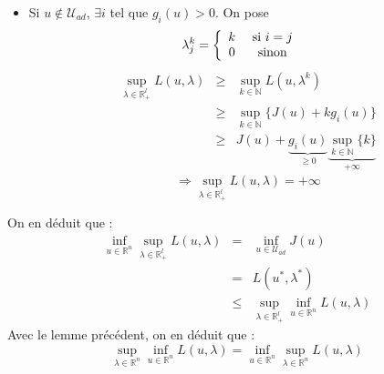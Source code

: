 \begin{dem}
\begin{itemize}
	\item Si $u\not\in \mathcal{U}_{ad}$, $\exists i$ tel que $g_i(u)>0$. On pose 
	\[\lambda_j^k=\left\{ \begin{array}{c c c} k &\text{ si } i=j \\ 0 &\text{ sinon}& \end{array} \right.\]
	\begin{eqnarray*}
		\sup_{\lambda\in\mathbb{R}^l_+} L(u,\lambda) &\geq& \sup_{k\in \mathbb{N}} L(u,\lambda^k) \\
							&\geq& \sup_{k\in\mathbb{N}} \{J(u)+kg_i(u)\} \\
							&\geq& J(u)+\underbrace{g_i(u)}_{\geq 0} \underbrace{\sup_{k\in\mathbb{N}} \{k\}}_{+\infty}
	\end{eqnarray*}
	\[\Rightarrow \sup_{\lambda\in\mathbb{R}^l_+} L(u,\lambda)=+\infty\]
\end{itemize}

On en déduit que :
\begin{eqnarray*}
	\inf_{u\in\mathbb{R}^n} \sup_{\lambda\in\mathbb{R}^l_+} L(u,\lambda)&=&\inf_{u\in\mathcal{U}_{ad}} J(u) \\
									&=& L(u^*,\lambda^*)\\
									&\leq& \sup_{\lambda\in\mathbb{R}^l_+} \inf_{u\in\mathbb{R}^n} L(u,\lambda)
\end{eqnarray*}
Avec le lemme précédent, on en déduit que :
	\[\sup_{\lambda\in\mathbb{R}^n} \inf_{u\in\mathbb{R}^n} L(u,\lambda)= \inf_{u\in\mathbb{R}^n}\sup_{\lambda\in\mathbb{R}^n} L(u,\lambda)\]
\end{dem}
